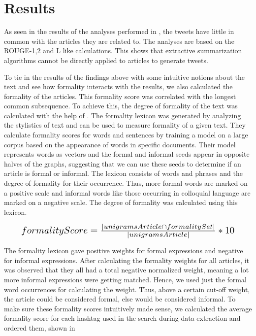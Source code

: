\section{Results}
As seen in the results of the analyses performed in , the tweets have little in common with the articles they are related to. The analyses are based on the ROUGE-1,2 and L like calculations. This shows that extractive summarization algorithms cannot be directly applied to articles to generate tweets. 

To tie in the results of the findings above with some intuitive notions about the text and see how formality interacts with the results, we also calculated the formality of the articles. This formality score was correlated with the longest common subsequence. To achieve this, the degree of formality of the text was calculated with the help of . The formality lexicon was generated by analyzing the stylistics of text and can be used to measure formality of a given text. They calculate formality scores for words and sentences by training a model on a large corpus based on the appearance of words in specific documents. Their model represents words as vectors and the formal and informal seeds appear in opposite halves of the graphs, suggesting that we can use these seeds to determine if an article is formal or informal. The lexicon consists of words and phrases and the degree of formality for their occurrence. Thus, more formal words are marked on a positive scale and informal words like those occurring in colloquial language are marked on a negative scale. The degree of formality was calculated using this lexicon.

\begin{equation}
\resizebox{.9\hsize}{!}{$formalityScore = \frac{| unigramsArticle \cap formalitySet |}{| unigramsArticle |} * 10$}
\end{equation}

The formality lexicon gave positive weights for formal expressions and negative for informal expressions. After calculating the formality weights for all articles, it was observed that they all had a total negative normalized weight, meaning a lot more informal expressions were getting matched. Hence, we used just the formal word occurrences for calculating the weight. Thus, above a certain cut-off weight, the article could be considered formal, else would be considered informal. To make sure these formality scores intuitively made sense, we calculated the average formality score for each hashtag used in the search during data extraction and ordered them, shown in 


